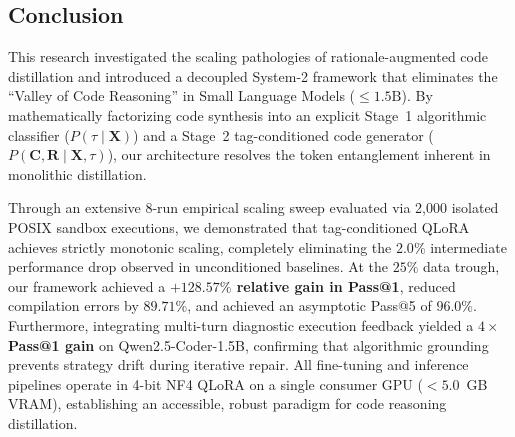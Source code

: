 \documentclass{ieeeaccess}
\begin{document}
\subsection{Conclusion}
This research investigated the scaling pathologies of rationale-augmented code distillation and introduced a decoupled System-2 framework that eliminates the ``Valley of Code Reasoning'' in Small Language Models ($\le 1.5\text{B}$). By mathematically factorizing code synthesis into an explicit Stage~1 algorithmic classifier ($P(\tau \mid \mathbf{X})$) and a Stage~2 tag-conditioned code generator ($P(\mathbf{C}, \mathbf{R} \mid \mathbf{X}, \tau)$), our architecture resolves the token entanglement inherent in monolithic distillation.

Through an extensive 8-run empirical scaling sweep evaluated via 2,000 isolated POSIX sandbox executions, we demonstrated that tag-conditioned QLoRA achieves strictly monotonic scaling, completely eliminating the $2.0\%$ intermediate performance drop observed in unconditioned baselines. At the $25\%$ data trough, our framework achieved a \textbf{$+128.57\%$ relative gain in Pass@1}, reduced compilation errors by \textbf{$89.71\%$}, and achieved an asymptotic Pass@5 of \textbf{$96.0\%$}. Furthermore, integrating multi-turn diagnostic execution feedback yielded a \textbf{$4\times$ Pass@1 gain} on Qwen2.5-Coder-1.5B, confirming that algorithmic grounding prevents strategy drift during iterative repair. All fine-tuning and inference pipelines operate in 4-bit NF4 QLoRA on a single consumer GPU ($<5.0$~GB VRAM), establishing an accessible, robust paradigm for code reasoning distillation.
\end{document}
